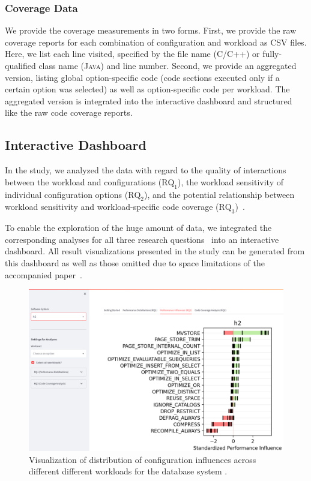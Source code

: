 {\subsubsection{Coverage Data}
We provide the coverage measurements in two forms. First, we provide the raw coverage reports for each combination of configuration and workload as CSV files. Here, we list each line visited, specified by the file name (\textsc{C/C++}) or fully-qualified class name (\textsc{Java}) and line number. Second, we provide an aggregated version, listing global option-specific code (code sections executed only if a certain option was selected) as well as option-specific code per workload. The aggregated version is integrated into the interactive dashboard and structured like the raw code coverage reports.


\color{black}
\subsection{Interactive Dashboard}
In the study, we analyzed the data with regard to the quality of interactions between the workload and configurations ($\text{RQ}_\text{1}$), the workload sensitivity of individual configuration options ($\text{RQ}_\text{2}$), and the potential relationship between workload sensitivity and workload-specific code coverage ($\text{RQ}_\text{3}$)~\cite{muhlbauer_workload_2023}. 

To enable the exploration of the huge amount of data, we integrated the corresponding analyses for all three research questions~\cite{muhlbauer_workload_2023} into an interactive dashboard. All result visualizations presented in the study can be generated from this dashboard as well as those omitted due to space limitations of the accompanied paper~\cite{muhlbauer_workload_2023}. 
\begin{figure}[]
	\centering
	\includegraphics[width=0.91\linewidth]{images/rq2.png}
	\caption{Visualization of distribution of configuration influences across different different workloads for the database system \htwo.}
	\label{fig:dashboard}
\end{figure}

}
